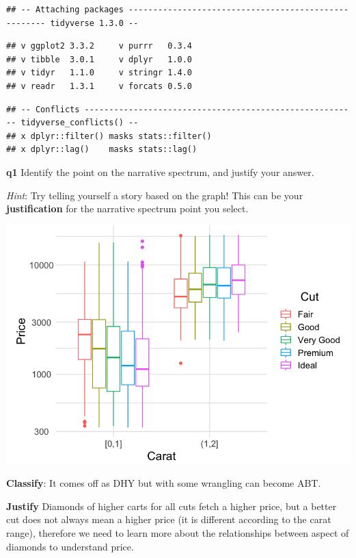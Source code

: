 \documentclass[
]{article}
\begin{document}
\begin{verbatim}
## -- Attaching packages ----------------------------------------------------- tidyverse 1.3.0 --
\end{verbatim}

\begin{verbatim}
## v ggplot2 3.3.2     v purrr   0.3.4
## v tibble  3.0.1     v dplyr   1.0.0
## v tidyr   1.1.0     v stringr 1.4.0
## v readr   1.3.1     v forcats 0.5.0
\end{verbatim}

\begin{verbatim}
## -- Conflicts -------------------------------------------------------- tidyverse_conflicts() --
## x dplyr::filter() masks stats::filter()
## x dplyr::lag()    masks stats::lag()
\end{verbatim}

\textbf{q1} Identify the point on the narrative spectrum, and justify
your answer.

\emph{Hint}: Try telling yourself a story based on the graph! This can
be your \textbf{justification} for the narrative spectrum point you
select.

\includegraphics{d20-e-comm01-story-basics-assignment_files/figure-latex/q1-vis-1.png}

\textbf{Classify}: It comes off as DHY but with some wrangling can
become ABT.

\textbf{Justify} Diamonds of higher carts for all cuts fetch a higher
price, but a better cut does not always mean a higher price (it is
different according to the carat range), therefore we need to learn more
about the relationships between aspect of diamonds to understand price.
\end{document}
